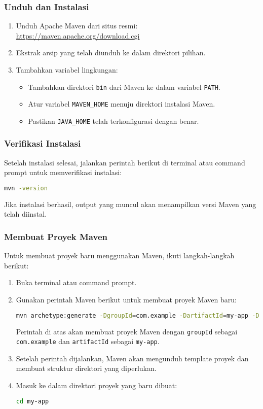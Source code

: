 \subsubsection{Unduh dan Instalasi}
\begin{enumerate}
	\item Unduh Apache Maven dari situs resmi: \url{https://maven.apache.org/download.cgi}
	\item Ekstrak arsip yang telah diunduh ke dalam direktori pilihan.
	\item Tambahkan variabel lingkungan:
	\begin{itemize}
		\item Tambahkan direktori \texttt{bin} dari Maven ke dalam variabel \texttt{PATH}.
		\item Atur variabel \texttt{MAVEN\_HOME} menuju direktori instalasi Maven.
		\item Pastikan \texttt{JAVA\_HOME} telah terkonfigurasi dengan benar.
	\end{itemize}
\end{enumerate}

\subsubsection{Verifikasi Instalasi}
Setelah instalasi selesai, jalankan perintah berikut di terminal atau command prompt untuk memverifikasi instalasi:

\begin{lstlisting}[language=bash]
	mvn -version
\end{lstlisting}

Jika instalasi berhasil, output yang muncul akan menampilkan versi Maven yang telah diinstal.

\subsubsection{Membuat Proyek Maven}
Untuk membuat proyek baru menggunakan Maven, ikuti langkah-langkah berikut:

\begin{enumerate}
	\item Buka terminal atau command prompt.
	\item Gunakan perintah Maven berikut untuk membuat proyek Maven baru:
	\begin{lstlisting}[language=bash]
		mvn archetype:generate -DgroupId=com.example -DartifactId=my-app -DarchetypeArtifactId=maven-archetype-quickstart -DinteractiveMode=false
	\end{lstlisting}
	Perintah di atas akan membuat proyek Maven dengan \texttt{groupId} sebagai \texttt{com.example} dan \texttt{artifactId} sebagai \texttt{my-app}.
	\item Setelah perintah dijalankan, Maven akan mengunduh template proyek dan membuat struktur direktori yang diperlukan.
	\item Masuk ke dalam direktori proyek yang baru dibuat:
	\begin{lstlisting}[language=bash]
		cd my-app
	\end{lstlisting}
\end{enumerate}

